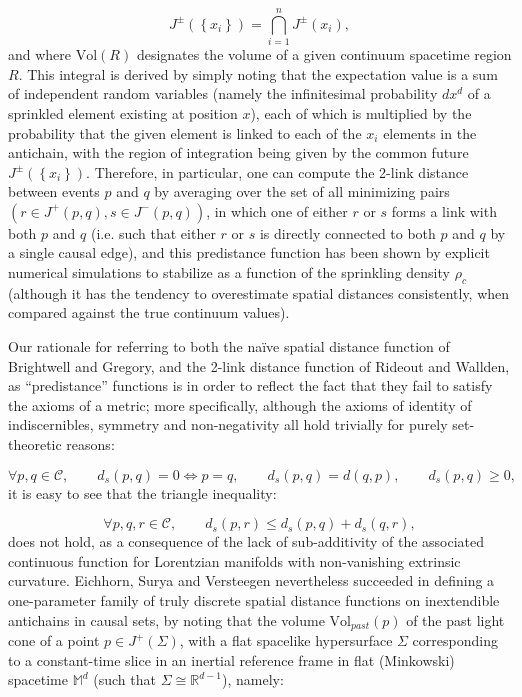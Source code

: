 \documentclass{article}
\begin{document}
\begin{equation}
J^{\pm} \left( \left\lbrace x_i \right\rbrace \right) = \bigcap_{i = 1}^{n} J^{\pm} \left( x_i \right),
\end{equation}
and where ${\mathrm{Vol} \left( R \right)}$ designates the volume of a given continuum spacetime region $R$. This integral is derived by simply noting that the expectation value is a sum of independent random variables (namely the infinitesimal probability ${d x^d}$ of a sprinkled element existing at position $x$), each of which is multiplied by the probability that the given element is linked to each of the ${x_i}$ elements in the antichain, with the region of integration being given by the common future ${J^{\pm} \left( \left\lbrace x_i \right\rbrace \right)}$. Therefore, in particular, one can compute the 2-link distance between events $p$ and $q$ by averaging over the set of all minimizing pairs ${\left( r \in J^{+} \left( p, q \right), s \in J^{-} \left( p, q \right) \right)}$, in which one of either $r$ or $s$ forms a link with both $p$ and $q$ (i.e. such that either $r$ or $s$ is directly connected to both $p$ and $q$ by a single causal edge), and this predistance function has been shown by explicit numerical simulations to stabilize as a function of the sprinkling density ${\rho_c}$ (although it has the tendency to overestimate spatial distances consistently, when compared against the true continuum values).

Our rationale for referring to both the na\"ive spatial distance function of Brightwell and Gregory, and the 2-link distance function of Rideout and Wallden, as ``predistance'' functions is in order to reflect the fact that they fail to satisfy the axioms of a metric; more specifically, although the axioms of identity of indiscernibles, symmetry and non-negativity all hold trivially for purely set-theoretic reasons:

\begin{equation}
\forall p, q \in \mathcal{C}, \qquad d_s \left( p, q \right) = 0 \iff p = q, \qquad d_s \left( p, q \right) = d \left( q, p \right), \qquad d_s \left( p, q \right) \geq 0,
\end{equation}
it is easy to see that the triangle inequality:

\begin{equation}
\forall p, q, r \in \mathcal{C}, \qquad d_s \left( p, r \right) \leq d_s \left( p, q \right) + d_s \left( q, r \right),
\end{equation}
does not hold, as a consequence of the lack of sub-additivity of the associated continuous function for Lorentzian manifolds with non-vanishing extrinsic curvature. Eichhorn, Surya and Versteegen\cite{eichhorn} nevertheless succeeded in defining a one-parameter family of truly discrete spatial distance functions on inextendible antichains in causal sets, by noting that the volume ${\mathrm{Vol}_{past} \left( p \right)}$ of the past light cone of a point ${p \in J^{+} \left( \Sigma \right)}$, with a flat spacelike hypersurface ${\Sigma}$ corresponding to a constant-time slice in an inertial reference frame in flat (Minkowski) spacetime ${\mathbb{M}^d}$ (such that ${\Sigma \cong \mathbb{R}^{d -1}}$), namely:
\end{document}
